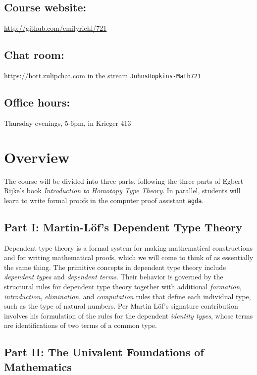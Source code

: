 \documentclass{amsart}
\theoremstyle{definition}
\theoremstyle{remark}
\numberwithin{equation}{section}
\begin{document}
 \subsection*{Course website:} \url{http://github.com/emilyriehl/721}
\subsection*{Chat room:} \url{https://hott.zulipchat.com} in the stream \texttt{JohnsHopkins-Math721}

 \subsection*{Office hours:} Thursday evenings, 5-6pm, in Krieger 413



\section*{Overview} 

The course will be divided into three parts, following the three parts of Egbert Rijke's book \emph{Introduction to Homotopy Type Theory}. In parallel, students will learn to write formal proofs in the computer proof assistant \texttt{agda}.

\subsection*{Part I: Martin-L\"{o}f's Dependent Type Theory} Dependent type theory is a formal system for making mathematical constructions and for writing mathematical proofs, which we will come to think of as essentially the same thing. The primitive concepts in dependent type theory include \emph{dependent types} and \emph{dependent terms}. Their behavior is governed by the structural rules for dependent type theory together with additional \emph{formation}, \emph{introduction}, \emph{elimination}, and \emph{computation} rules that define each individual type, such as the type of natural numbers. Per Martin L\"{o}f's signature contribution involves his formulation of the rules for the dependent \emph{identity types}, whose terms are identifications of two terms of a common type. 

\subsection*{Part II: The Univalent Foundations of Mathematics}
\end{document}
